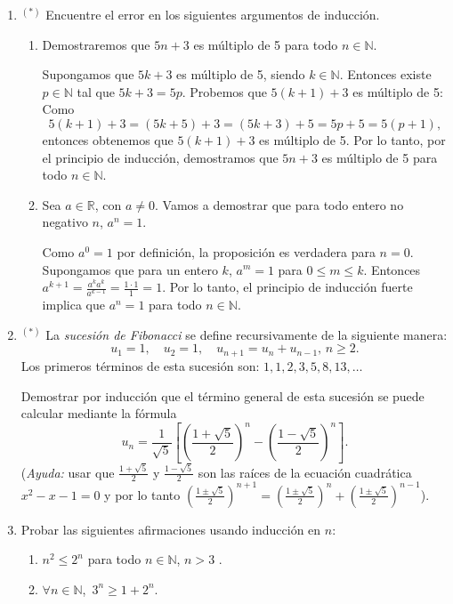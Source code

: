 \documentclass[a4paper,12pt,twoside,spanish,reqno]{amsbook}
\numberwithin{equation}{section}
\begin{document}
\begin{enumerate}[resume]
\item${}^{(*)}$ Encuentre el error en los siguientes argumentos de inducción.
    \begin{enumerate}
        \item  Demostraremos que $5n+3$ es múltiplo de 5 para todo $n\in \mathbb N$.

            Supongamos que $5k+3$ es múltiplo de 5, siendo $k\in \mathbb N$. Entonces existe
            $p\in \mathbb N$ tal que  $5k+3=5p$. Probemos que $5(k+1)+3$ es múltiplo de 5:
            Como
            $$
            5(k+1)+3=(5k+5)+3=(5k+3)+5=5p+5=5(p+1),
            $$
            entonces obtenemos que $5(k+1)+3$ es múltiplo de 5. Por lo tanto, por el principio
            de inducción, demostramos que $5n+3$ es múltiplo de 5 para todo $n\in \mathbb
            N$.

        \item Sea $a\in\mathbb R$, con $a\neq 0$. Vamos a demostrar que para todo entero no negativo $n$, $a^n=1$.

            Como $a^0=1$ por definición, la proposición es verdadera para $n=0$. Supongamos
            que para  un entero $k$, $a^m=1$ para $0\leq m \leq k$. Entonces
            $a^{k+1}= \frac{a^k a^k}{a^{k-1}}=\frac{1\cdot1}1=1$.
            Por lo tanto, el principio de inducción fuerte implica que $a^n=1$ para todo $n\in \mathbb N$.
    \end{enumerate}

\item${}^{(*)}$ La \emph{sucesión de Fibonacci} se define recursivamente de la siguiente manera:
    \begin{equation*}
        u_1=1,\quad u_2=1,\quad u_{n+1}=u_{n}+u_{n-1}, \, n\geq 2.
    \end{equation*}
    Los primeros términos de esta sucesión son: $1,1,2,3,5,8,13,\ldots$

    Demostrar por inducción que el término general de esta sucesión se puede calcular mediante la fórmula
    \[ u_n= \frac{1}{\sqrt{5}}\left[\left(\frac{1+\sqrt{5}}{2}\right)^n-\left(\frac{1-\sqrt{5}}{2}\right)^n\right].\]
    (\textit{Ayuda:} usar que $\frac{1+\sqrt{5}}{2}$ y $\frac{1-\sqrt{5}}{2}$ son las raíces de la ecuación cuadrática $x^2-x-1=0$ y por lo tanto  $\left(\frac{1\pm\sqrt{5}}{2}\right)^{n+1} = \left(\frac{1\pm\sqrt{5}}{2}\right)^{n}+\left(\frac{1\pm\sqrt{5}}{2}\right)^{n-1}$).

\item Probar las siguientes afirmaciones usando inducción en $n$:
    \begin{enumerate}
        \item $n^2\leq 2^n$ para todo $n\in{\mathbb N}$, $n>3$ .
        \item $\forall n \in {\mathbb N}$,\ $3^n \ge 1 + 2^n$.
    \end{enumerate}

\end{enumerate}
\end{document}
